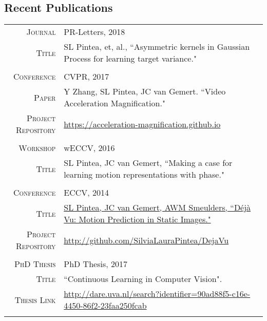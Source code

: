 \documentclass[a4paper, oneside, final]{scrartcl}
\newcommand{\gray}{\rowcolor[gray]{.90}}
\begin{document}
\begin{center}
		\section{Recent Publications}
		\begin{tabular}{r@{\hskip 0.3in}p{11.3cm}}
			\gray \textsc{Journal}    & PR-Letters, 2018\\ 
					\textsc{Title}	  & SL Pintea, et, al., ``Asymmetric kernels in Gaussian Process for learning target variance."\\
			\multicolumn{2}{c}{}\\
			\gray \textsc{Conference}   & CVPR, 2017\\
			\textsc{Paper}			    & Y Zhang, SL Pintea, JC van Gemert. ``Video Acceleration Magnification."\\ 
            \textsc{Project Repository} & \small\href{https://acceleration-magnification.github.io}{https://acceleration-magnification.github.io} \\
			\multicolumn{2}{c}{}\\
			\gray \textsc{Workshop} & wECCV, 2016\\
			\textsc{Title}			& SL Pintea, JC van Gemert, ``Making a case for learning motion representations with phase."\\ 
			\multicolumn{2}{c}{}\\
			\gray \textsc{Conference}   & ECCV, 2014\\
				\textsc{Title}			& \href{https://staff.fnwi.uva.nl/s.l.pintea/dejavu/}{SL Pintea, JC van Gemert, AWM Smeulders, ``D\'{e}j\`{a} Vu: Motion Prediction in Static Images."}\\	
			\textsc{Project Repository}  & \small\href{http://github.com/SilviaLauraPintea/DejaVu}
				{http://github.com/SilviaLauraPintea/DejaVu}\\ 
			\multicolumn{2}{c}{}\\
			\gray \textsc{PhD Thesis} & PhD Thesis, 2017\\
			\textsc{Title}			  & ``Continuous Learning in Computer Vision".\\ 
			\textsc{Thesis Link}      & \small\href{http://dare.uva.nl/search?identifier=90ad88f5-c16e-4450-86f2-23faa250fcab}
					{http://dare.uva.nl/search?identifier=90ad88f5-c16e-4450-86f2-23faa250fcab}\\
			\multicolumn{2}{c}{}\\
		\end{tabular}

\end{center}
\end{document}
